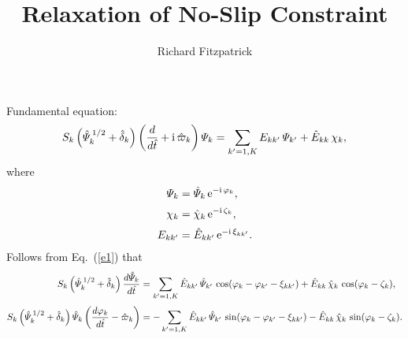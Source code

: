 \documentclass[12pt]{article}
\title{Relaxation of No-Slip Constraint}
\author{Richard Fitzpatrick}
\begin{document}
\maketitle

Fundamental equation:
\begin{equation}\label{e1}
S_k\left(\hat{\mit\Psi}_k^{\,1/2} +\hat{\delta}_k\right)\left(\frac{d}{d\hat{t}} + {\rm i}\,\hat{\varpi}_k\right){\mit\Psi}_k = \sum_{k'=1,K}E_{kk'}\,{\mit\Psi}_{k'}
+ \hat{E}_{kk}\,\chi_k,
\end{equation}
where
\begin{align}
{\mit\Psi}_k &= \hat{\mit\Psi}_k\,{\rm e}^{-{\rm i}\,\varphi_k},\\[0.5ex]
\chi_k &= \hat{\chi}_k\,{\rm e}^{-{\rm i}\,\zeta_k},\\[0.5ex]
E_{kk'} &=\hat{E}_{kk'}\,{\rm e}^{-{\rm i}\,\xi_{kk'}}.
\end{align}
Follows from Eq.~(\ref{e1}) that
\begin{align}
S_k\left(\hat{\mit\Psi}_k^{\,1/2} +\hat{\delta}_k\right)\frac{d\hat{\mit\Psi}_k}{d\hat{t}}&= \sum_{k'=1,K}\hat{E}_{kk'}\,\hat{\mit\Psi}_{k'}\,\cos(\varphi_k-\varphi_{k'}-\xi_{kk'})
+ \hat{E}_{kk}\,\hat{\chi}_k\,\cos(\varphi_k-\zeta_k),\\[0.5ex]
S_k\left(\hat{\mit\Psi}_k^{\,1/2} +\hat{\delta}_k\right)\hat{\mit\Psi}_k\left(\frac{d\varphi_k}{d\hat{t}}-\hat{\varpi}_k\right)&=- \sum_{k'=1,K}\hat{E}_{kk'}\,\hat{\mit\Psi}_{k'}\,\sin(\varphi_k-\varphi_{k'}-\xi_{kk'})-
 \hat{E}_{kk}\,\hat{\chi}_k\,\sin(\varphi_k-\zeta_k).
\end{align}
\end{document}
